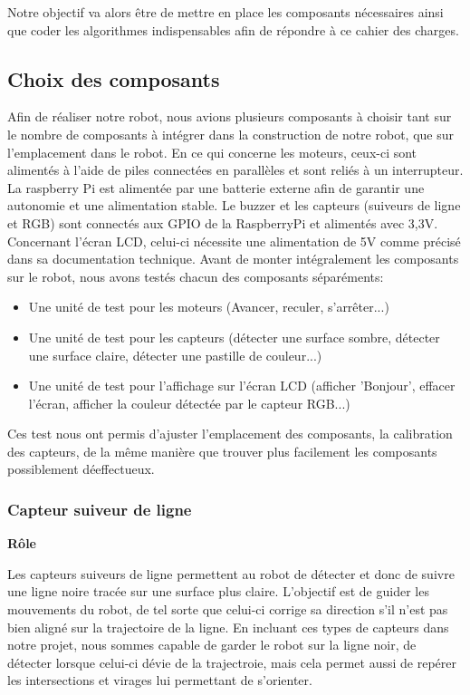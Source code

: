 \documentclass[11pt,a4paper]{article}
\begin{document}
Notre objectif va alors être de mettre en place les composants nécessaires ainsi que coder les algorithmes indispensables afin de répondre à ce cahier des charges.

\subsection{Choix des composants}

Afin de réaliser notre robot, nous avions plusieurs composants à choisir tant sur le nombre de composants à intégrer dans la construction de notre robot, que sur l'emplacement dans le robot.
En ce qui concerne les moteurs, ceux-ci sont alimentés à l'aide de piles connectées en parallèles et sont reliés à un interrupteur.
La raspberry Pi est alimentée par une batterie externe afin de garantir une autonomie et une alimentation stable.
Le buzzer et les capteurs (suiveurs de ligne et RGB) sont connectés aux GPIO de la RaspberryPi et alimentés avec 3,3V.
Concernant l'écran LCD, celui-ci nécessite une alimentation de 5V comme précisé dans sa documentation technique.
Avant de monter intégralement les composants sur le robot, nous avons testés chacun des composants séparéments:
\begin{itemize}
    \item Une unité de test pour les moteurs (Avancer, reculer, s'arrêter...)
    \item Une unité de test pour les capteurs (détecter une surface sombre, détecter une surface claire, détecter une pastille de couleur...)
    \item Une unité de test pour l'affichage sur l'écran LCD (afficher 'Bonjour', effacer l'écran, afficher la couleur détectée par le capteur RGB...)
\end{itemize}
Ces test nous ont permis d'ajuster l'emplacement des composants, la calibration des capteurs, de la même manière que trouver plus facilement les composants possiblement déeffectueux.

\subsubsection{Capteur suiveur de ligne}
\textbf{Rôle}

Les capteurs suiveurs de ligne permettent au robot de détecter et donc de suivre une ligne noire tracée sur une surface plus claire.
L'objectif est de guider les mouvements du robot, de tel sorte que celui-ci corrige sa direction s'il n'est pas bien aligné sur la trajectoire de la ligne.
En incluant ces types de capteurs dans notre projet, nous sommes capable de garder le robot sur la ligne noir, de détecter lorsque celui-ci dévie de la trajectroie, mais cela permet 
aussi de repérer les intersections et virages lui permettant de s'orienter.
\end{document}
